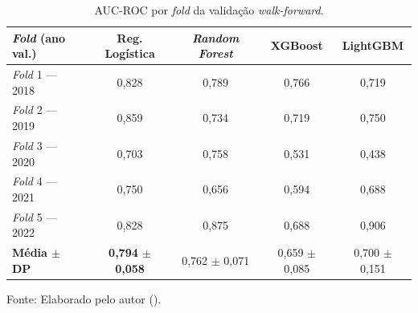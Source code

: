 \begin{table}[htbp]
    \centering
    \caption[AUC-ROC por \textit{fold} \textit{walk-forward}]{AUC-ROC por \textit{fold} da validação \textit{walk-forward}.}
    \label{tab:walkforward}
    \begin{tabular}{lcccc}
        \toprule
        \textbf{\textit{Fold} (ano val.)} & \textbf{Reg. Logística} & \textbf{\textit{Random Forest}} & \textbf{XGBoost} & \textbf{LightGBM} \\
        \midrule
        \textit{Fold} 1 --- 2018 & 0,828 & 0,789 & 0,766 & 0,719 \\
        \textit{Fold} 2 --- 2019 & 0,859 & 0,734 & 0,719 & 0,750 \\
        \textit{Fold} 3 --- 2020 & 0,703 & 0,758 & 0,531 & 0,438 \\
        \textit{Fold} 4 --- 2021 & 0,750 & 0,656 & 0,594 & 0,688 \\
        \textit{Fold} 5 --- 2022 & 0,828 & 0,875 & 0,688 & 0,906 \\
        \midrule
        \textbf{Média $\pm$ DP} & \textbf{0,794 $\pm$ 0,058} & 0,762 $\pm$ 0,071 & 0,659 $\pm$ 0,085 & 0,700 $\pm$ 0,151 \\
        \bottomrule
    \end{tabular}

    \vspace{2pt}
    {\small Fonte: Elaborado pelo autor (\the\year).}
\end{table}
